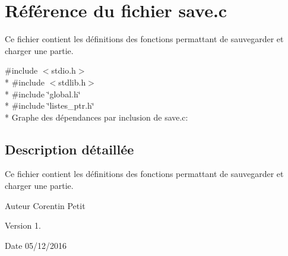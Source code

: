 \hypertarget{a00027}{}\section{Référence du fichier save.\+c}
\label{a00027}


Ce fichier contient les définitions des fonctions permattant de sauvegarder et charger une partie.  


{\ttfamily \#include $<$stdio.\+h$>$}\\*
{\ttfamily \#include $<$stdlib.\+h$>$}\\*
{\ttfamily \#include \char`\"{}global.\+h\char`\"{}}\\*
{\ttfamily \#include \char`\"{}listes\+\_\+ptr.\+h\char`\"{}}\\*
Graphe des dépendances par inclusion de save.\+c\+:


\subsection{Description détaillée}
Ce fichier contient les définitions des fonctions permattant de sauvegarder et charger une partie. 

\begin{DoxyAuthor}{Auteur}
Corentin Petit 
\end{DoxyAuthor}
\begin{DoxyVersion}{Version}
1. 
\end{DoxyVersion}
\begin{DoxyDate}{Date}
05/12/2016 
\end{DoxyDate}
